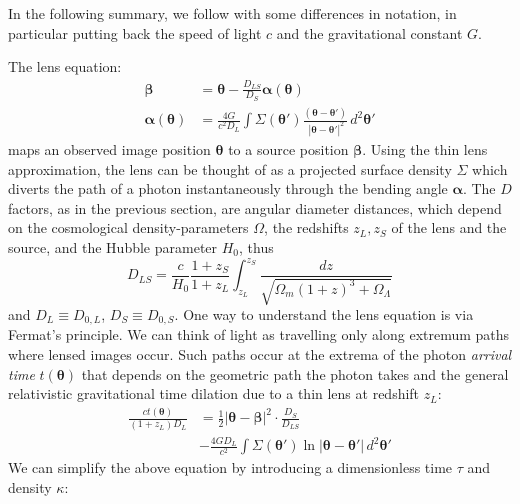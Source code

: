 \documentclass[galley,usenatbib]{mn2e}
\renewcommand{\vec}[1]{\ensuremath{\boldsymbol{#1}}}
\begin{document}
In the following summary, we follow \cite{1986ApJ...310..568B} with
some differences in notation, in particular putting back the
speed of light $c$ and the gravitational constant $G$.

The lens equation:
%
\begin{equation}
\begin{aligned}
    \vec\beta &= \vec\theta - \frac{D_{LS}}{D_S}\vec\alpha(\vec\theta) \\
\vec\alpha(\vec\theta) &= \frac{4G}{c^2D_L} \int \Sigma(\vec\theta')
                          \frac{(\vec\theta - \vec\theta')}
                          {\ |\vec\theta - \vec\theta'|^2} \, d^2\vec\theta'
\end{aligned}
\label{eqn:lens_equation}
\end{equation}
%
maps an observed image position $\vec\theta$ to a source position
$\vec\beta$.  Using the thin lens approximation, the lens can be thought of as
a projected surface density $\Sigma$ which diverts the path of a photon
instantaneously through the bending angle $\vec\alpha$.  The $D$ factors, as in
the previous section, are angular diameter distances, which depend on the
cosmological density-parameters $\Omega$, the redshifts $z_L,z_S$ of the lens
and the source, and the Hubble parameter $H_0$, thus
%
\begin{equation}
D_{LS} = \frac c{H_0} \frac{1+z_S}{1+z_L} \int_{z_L}^{z_S}
                      \frac{dz}{\sqrt{\Omega_m(1+z)^3 + \Omega_\Lambda}}
\end{equation}
%
and $D_L \equiv D_{0,L}$, $D_S \equiv D_{0,S}$.  One way to understand the lens
equation is via Fermat's principle. We can think of light as travelling only
along extremum paths where lensed images occur.  Such paths occur at the
extrema of the photon {\it arrival time} $t(\vec\theta)$ that depends on the
geometric path the photon takes and the general relativistic gravitational time
dilation due to a thin lens at redshift $z_L$:
%
\begin{equation}
\begin{aligned}
\frac{ct(\vec\theta)}{(1+z_L)D_{L}}
&= {\textstyle\frac12} |\vec\theta - \vec\beta|^2
   \cdot \frac{D_{S}}{D_{LS}} \\
&- \frac{4GD_L}{c^2}
   \int \Sigma(\vec\theta') \ln |\vec\theta-\vec\theta'| \, d^2\vec\theta'
\label{full arrival time}
\end{aligned}
\end{equation}
%
We can simplify the above equation by introducing a dimensionless time $\tau$
and density $\kappa$: 
\end{document}
